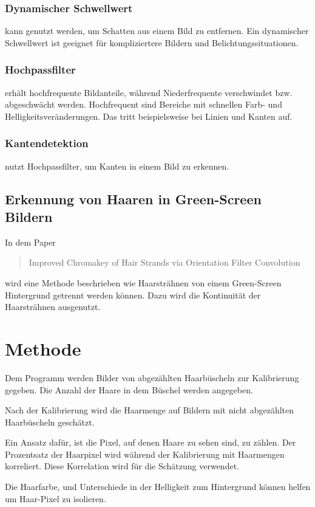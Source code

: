 \documentclass[german,a4paper,12pt]{llncs}
\begin{document}
\subsubsection{Dynamischer Schwellwert}
kann genutzt werden, um Schatten aus einem Bild zu entfernen. Ein dynamischer Schwellwert ist geeignet für kompliziertere Bildern und Belichtungssituationen.


\subsubsection{Hochpassfilter}
erhält hochfrequente Bildanteile, während Niederfrequente verschwindet bzw. abgeschwächt werden. 
Hochfrequent sind Bereiche mit schnellen Farb- und Helligkeitsveränderungen. Das tritt beispielsweise bei Linien und Kanten auf.

\subsubsection{Kantendetektion}

nutzt Hochpassfilter, um Kanten in einem Bild zu erkennen. 

\subsection{Erkennung von Haaren in Green-Screen Bildern}

In dem Paper\blockquote{Improved Chromakey of Hair Strands via Orientation Filter Convolution} wird eine Methode beschrieben wie Haarsträhnen von einem Green-Screen Hintergrund getrennt werden können. Dazu wird die Kontinuität der Haarsträhnen ausgenutzt. \cite{GreenScreenHair}

\section{Methode}
Dem Programm werden Bilder von abgezählten Haarbüscheln zur Kalibrierung gegeben. Die Anzahl der Haare in dem Büschel werden angegeben. 

Nach der Kalibrierung wird die Haarmenge auf Bildern mit nicht abgezählten Haarbüscheln geschätzt.

Ein Ansatz dafür, ist die Pixel, auf denen Haare zu sehen sind, zu zählen. Der Prozentsatz der Haarpixel wird während der Kalibrierung mit Haarmengen korreliert. Diese Korrelation wird für die Schätzung verwendet.
 
Die Haarfarbe, und Unterschiede in der Helligkeit zum Hintergrund können helfen um Haar-Pixel zu isolieren. 
\end{document}
